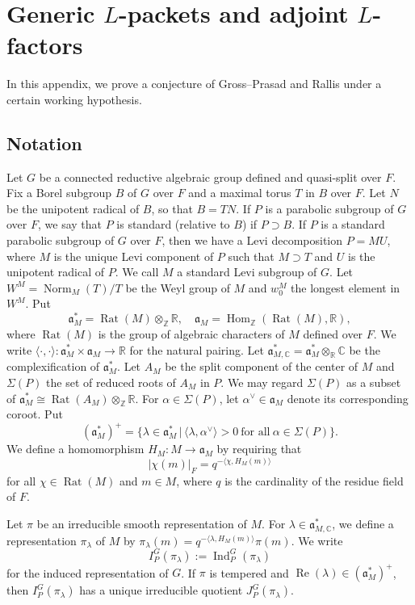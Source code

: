 \documentclass[11pt]{amsart}
\numberwithin{equation}{section}
\theoremstyle{plain}
\theoremstyle{definition}
\theoremstyle{remark}
\def\Hom{\operatorname{Hom}}
\def\Ind{\operatorname{Ind}}
\def\Norm{\operatorname{Norm}}
\def\Rat{\operatorname{Rat}}
\def\Re{\operatorname{Re}}
\def\CC{\mathbb{C}}
\def\RR{\mathbb{R}}
\def\ZZ{\mathbb{Z}}
\def\aa{\mathfrak{a}}
\begin{document}
\section{\textbf{Generic $L$-packets and adjoint $L$-factors}}

In this appendix, we prove a conjecture of Gross--Prasad and Rallis \cite[Conjecture 2.6]{gp1} under a certain working hypothesis.

\subsection{Notation}

Let $G$ be a connected reductive algebraic group defined and quasi-split over $F$.
Fix a Borel subgroup $B$ of $G$ over $F$ and a maximal torus $T$ in $B$ over $F$.
Let $N$ be the unipotent radical of $B$, so that $B = T N$.
If $P$ is a parabolic subgroup of $G$ over $F$, we say that $P$ is standard (relative to $B$) if $P \supset B$.
If $P$ is a standard parabolic subgroup of $G$ over $F$, then we have a Levi decomposition $P = MU$, where $M$ is the unique Levi component of $P$ such that $M \supset T$ and $U$ is the unipotent radical of $P$.
We call $M$ a standard Levi subgroup of $G$.
Let $W^M = \Norm_M(T)/T$ be the Weyl group of $M$ and $w^M_0$ the longest element in $W^M$.
Put
\[
 \aa_M^* = \Rat(M) \otimes_\ZZ \RR, \quad \aa_M = \Hom_\ZZ(\Rat(M), \RR),
\]
where $\Rat(M)$ is the group of algebraic characters of $M$ defined over $F$.
We write $\langle \cdot, \cdot \rangle : \aa_M^* \times \aa_M \rightarrow \RR$ for the natural pairing.
Let $\aa^*_{M,\CC} = \aa_M^* \otimes_\RR \CC$ be the complexification of $\aa_M^*$.
Let $A_M$ be the split component of the center of $M$ and $\Sigma(P)$ the set of reduced roots of $A_M$ in $P$.
We may regard $\Sigma(P)$ as a subset of $\aa_M^* \cong \Rat(A_M) \otimes_\ZZ \RR$.
For $\alpha \in \Sigma(P)$, let $\alpha^\vee \in \aa_M$ denote its corresponding coroot.
Put
\[
 (\aa_M^*)^+ = \{ \lambda \in \aa_M^{*} \, | \, \langle \lambda, \alpha^\vee \rangle > 0 \ \text{for all} \ \alpha \in \Sigma(P) \}.
\]
We define a homomorphism $H_M : M \rightarrow \aa_M$ by requiring that
\[
 |\chi(m)|_F = q^{-\langle \chi, H_M(m) \rangle}
\]
for all $\chi \in \Rat(M)$ and $m \in M$, where $q$ is the cardinality of the residue field of $F$.

Let $\pi$ be an irreducible smooth representation of $M$.
For $\lambda \in \aa^*_{M,\CC}$, we define a representation $\pi_\lambda$ of $M$ by $\pi_\lambda(m) = q^{- \langle \lambda, H_M(m) \rangle} \pi(m)$.
We write
\[
 I^G_P(\pi_\lambda) := \Ind^G_P(\pi_\lambda)
\]
for the induced representation of $G$.
If $\pi$ is tempered and $\Re(\lambda) \in (\aa^*_M)^+$, then $I^G_P(\pi_\lambda)$ has a unique irreducible quotient $J^G_P(\pi_\lambda)$.
\end{document}
